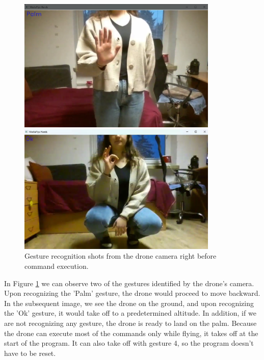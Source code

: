 \begin{figure}[ht]
	\centering
	\begin{minipage}{0.5\textwidth}
		\centering
		\includegraphics[width=0.85\textwidth]{images/palm_drone.png}
	\end{minipage}%
	\begin{minipage}{0.5\textwidth}
		\centering
		\includegraphics[width=0.85\textwidth]{images/ok_drone.png}
	\end{minipage}
	\caption{Gesture recognition shots from the drone camera right before command execution.}
	\label{fig:drone_detections} %
\end{figure}

In Figure \ref{fig:drone_detections} we can observe two of the gestures identified by the drone's camera. Upon recognizing the 'Palm' gesture, the drone would proceed to move backward. In the subsequent image, we see the drone on the ground, and upon recognizing the 'Ok' gesture, it would take off to a predetermined altitude.
In addition, if we are not recognizing any gesture, the drone is ready to land on the palm. Because the drone can execute most of the commands only while flying, it takes off at the start of the program. It can also take off with gesture 4, so the program doesn't have to be reset.


